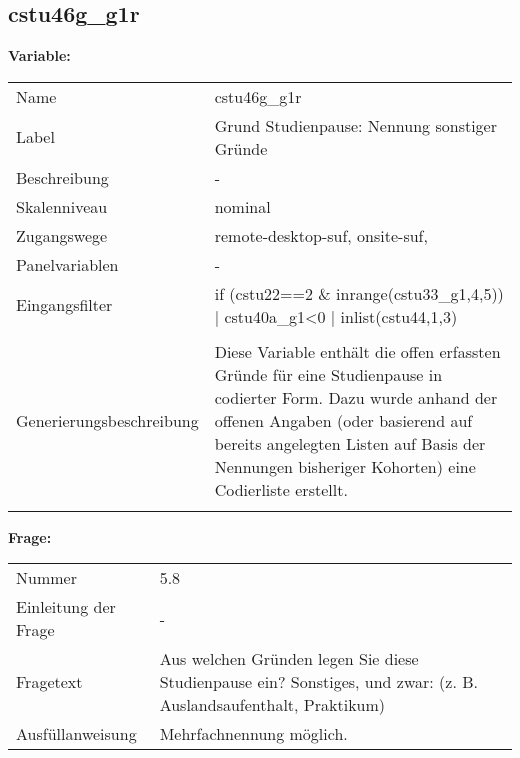 	
	
	\subsection{cstu46g\_g1r}
	\label{subSection:cstu46g_g1r}

	\noindent\textbf{Variable:}\\
		\begin{tabular}{lL{11.3cm}}
			\label{tableVariable:cstu46g_g1r}
			Name & cstu46g\_g1r \\
			Label & Grund Studienpause: Nennung sonstiger Gründe \\
			Beschreibung & - \\
			Skalenniveau & nominal \\
			Zugangswege &
				remote-desktop-suf,
				onsite-suf,
 \\
			Panelvariablen & -
			 \\
			Eingangsfilter & if (cstu22==2 \& inrange(cstu33\_g1,4,5)) | cstu40a\_g1\textless{}0 | inlist(cstu44,1,3) \\
 \\
					Generierungsbeschreibung & Diese Variable enthält die offen erfassten Gründe für eine Studienpause in codierter Form. Dazu wurde anhand der offenen Angaben (oder basierend auf bereits angelegten Listen auf Basis der Nennungen bisheriger Kohorten) eine Codierliste erstellt.
				 \\	
			 \\
		\end{tabular}

		\vspace*{1 cm}
		\noindent\textbf{Frage:}\\
		\begin{tabular}{lL{11.3cm}}
			\label{tableQuestion:cstu46g_g1r}
			Nummer & 5.8 \\
			Einleitung der Frage & - \\
			Fragetext & Aus welchen Gründen legen Sie diese Studienpause ein?
Sonstiges, und zwar:
(z. B. Auslandsaufenthalt, Praktikum) \\
			Ausfüllanweisung & Mehrfachnennung möglich. \\
		\end{tabular}





